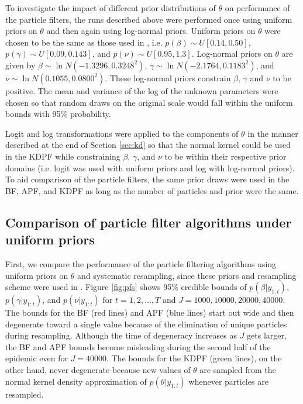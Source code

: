 \documentclass{elsarticle}
\begin{document}
To investigate the impact of different prior distributions of $\theta$ on performance of the particle filters, the runs described above were performed once using uniform priors on $\theta$ and then again using log-normal priors. Uniform priors on $\theta$ were chosen to be the same as those used in \citet{skvortsov2012monitoring}, i.e. $p(\beta) \sim U[0.14, 0.50]$, $p(\gamma) \sim U[0.09, 0.143]$, and $p(\nu) \sim U[0.95,1.3]$. Log-normal priors on $\theta$ are given by $\beta \sim \ln N\left(-1.3296, 0.3248^2\right)$, $\gamma \sim \ln N\left(-2.1764, 0.1183^2\right)$, and $\nu \sim \ln N\left(0.1055, 0.0800^2\right)$. These log-normal priors constrain $\beta$, $\gamma$ and $\nu$ to be positive. The mean and variance of the log of the unknown parameters were chosen so that random draws on the original scale would fall within the uniform bounds with 95\% probability.

Logit and log transformations were applied to the components of $\theta$ in the manner described at the end of Section \ref{sec:kd} so that the normal kernel could be used in the KDPF while constraining $\beta$, $\gamma$, and $\nu$ to be within their respective prior domains (i.e. logit was used with uniform priors and log with log-normal priors). To aid comparison of the particle filters, the same prior draws were used in the BF, APF, and KDPF as long as the number of particles and prior were the same.

\subsection{Comparison of particle filter algorithms under uniform priors} \label{sec:pfcomparison}

First, we compare the performance of the particle filtering algorithms using uniform priors on $\theta$ and systematic resampling, since these priors and resampling scheme were used in \citet{skvortsov2012monitoring}. Figure \ref{fig:pfs} shows 95\% credible bounds of $p(\beta|y_{1:t})$, $p(\gamma|y_{1:t})$, and $p(\nu|y_{1:t})$ for $t = 1,2,\ldots,T$ and $J = 1000, 10000, 20000, 40000$. The bounds for the BF (red lines) and APF (blue lines) start out wide and then degenerate toward a single value because of the elimination of unique particles during resampling. Although the time of degeneracy increases as $J$ gets larger, the BF and APF bounds become misleading during the second half of the epidemic even for $J = 40000$. The bounds for the KDPF (green lines), on the other hand, never degenerate because new values of $\theta$ are sampled from the normal kernel density approximation of $p(\theta|y_{1:t})$ whenever particles are resampled.
\end{document}
